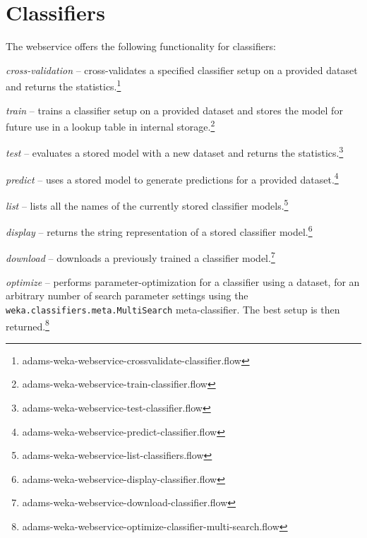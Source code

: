 \documentclass[a4paper]{book}
\begin{document}
\section{Classifiers}
The webservice offers the following functionality for classifiers:
\begin{tight_itemize}
	\item \textit{cross-validation} -- cross-validates a specified classifier
	setup on a provided dataset and returns the statistics.\footnote{adams-weka-webservice-crossvalidate-classifier.flow}
	\item \textit{train} -- trains a classifier setup on a provided dataset 
	and stores the model for future use in a lookup table in internal
	storage.\footnote{adams-weka-webservice-train-classifier.flow}
	\item \textit{test} -- evaluates a stored model with a new dataset and
	returns the statistics.\footnote{adams-weka-webservice-test-classifier.flow}
	\item \textit{predict} -- uses a stored model to generate predictions for
	a provided dataset.\footnote{adams-weka-webservice-predict-classifier.flow}
	\item \textit{list} -- lists all the names of the currently stored classifier
	models.\footnote{adams-weka-webservice-list-classifiers.flow}
	\item \textit{display} -- returns the string representation of a stored
	classifier model.\footnote{adams-weka-webservice-display-classifier.flow}
	\item \textit{download} -- downloads a previously trained a classifier 
	model.\footnote{adams-weka-webservice-download-classifier.flow}
	\item \textit{optimize} -- performs parameter-optimization for a classifier
	using a dataset, for an arbitrary number of search parameter settings using 
	the \texttt{weka.classifiers.meta.MultiSearch} meta-classifier. The best setup is 
	then returned.\footnote{adams-weka-webservice-optimize-classifier-multi-search.flow}
\end{tight_itemize}
\end{document}
